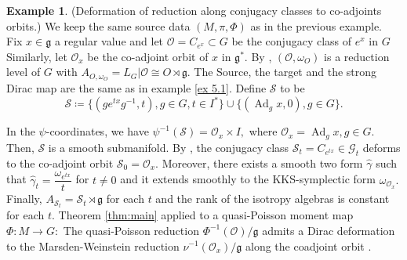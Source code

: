 \documentclass[reqno]{amsart}
\theoremstyle{plain}
\theoremstyle{definition}
\newtheorem{Exp}[Thm]{Example}
\newcommand{\G}{\mathcal{G}}
\newcommand{\g}{\mathfrak{g}}
\newcommand{\too}{\longrightarrow}
\newcommand{\Ad}{\operatorname{Ad}}
\renewcommand{\S}{\mathcal{S}}
\renewcommand{\O}{\mathcal{O}}
\begin{document}
\begin{Exp}(Deformation of reduction along conjugacy classes to co-adjoints orbits.)
We keep the same source data $(M,\pi,\Phi)$ as in the previous example. Fix $x\in \g$ a regular value and let $\O = C_{e^x}\subset G$ be the conjugacy class of $e^{x}$ in $G$ Similarly, let $\O_x$ be the co-adjoint orbit of $x$ in $\g^*$. By \cite[]{bualibanu2026reduction}, $(\O,\omega_O)$ is a reduction level of $G$ with $A_{O,\omega_O} = L_{G}|\O \cong O \rtimes \g.$ The Source, the target and the strong Dirac map are the same as in example \ref{ex 5.1}. Define $\S$ to be \[
\S \coloneqq \{(ge^{tx}g^{-1},t), g\in G, t\in I^*\} \cup \{(\Ad_{g}x,0), g\in G\}.
\]

In the $\psi$-coordinates, we have $\psi^{-1}(\S) = \O_x \times I,$ where $\O_x = {\Ad_{g}x, g\in G}.$ Then, $\S$ is a smooth submanifold. By \cite[]{burelle2026deformations}, the conjugacy class $\S_t = C_{e^{tx}} \in \G_t$ deforms to the co-adjoint orbit $\S_0 = \O_x.$ Moreover, there exists a smooth two form $\widehat{\gamma}$ such that $\widehat{\gamma}_t = \dfrac{\omega_{e^{tx}}}{t}$ for $t\neq 0$ and it extends smoothly to the KKS-symplectic form $\omega_{\O_x}.$ Finally, $A_{\S_t} = \S_t \rtimes \g$ for each $t$ and the rank of the isotropy algebras is constant for each $t.$ Theorem \ref{thm:main} applied to a quasi-Poisson moment map $\Phi:M\too G:$ The quasi-Poisson reduction $\Phi^{-1}(\O)/\g$ \cite[] {bualibanu2026reduction} admits a Dirac deformation to the Marsden-Weinstein reduction $\nu^{-1}(\O_x)/\g$ along the coadjoint orbit \cite[]{bualibanu2026reduction}.  
\end{Exp}
\end{document}
